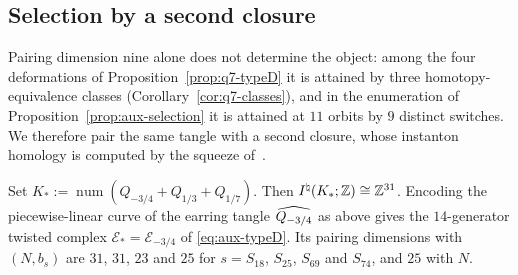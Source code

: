 \subsection{Selection by a second closure}\label{ss:second-closure}
Pairing dimension nine alone does not determine the object: among the four deformations of
Proposition~\ref{prop:q7-typeD} it is attained by three homotopy-equivalence classes
(Corollary~\ref{cor:q7-classes}), and in the enumeration of Proposition~\ref{prop:aux-selection} it is
attained at $11$ orbits by $9$ distinct switches.  We therefore pair the same tangle with a second
closure, whose instanton homology is computed by the squeeze of~\cite[\S3]{WuebbenII}.

\begin{proposition}\label{prop:aux-closure}
Set $K_*:=\operatorname{num}(Q_{-3/4}+Q_{1/3}+Q_{1/7})$.  Then $I^{\natural}(K_*;\mathbb{Z})\cong\mathbb{Z}^{31}$.  Encoding
the piecewise-linear curve of the earring tangle $\widehat{Q_{-3/4}}$ as above gives the $14$-generator twisted
complex $\mathcal E_*=\mathcal E_{-3/4}$ of \eqref{eq:aux-typeD}.  Its pairing dimensions with $(N,b_s)$ are
$31$, $31$, $23$ and $25$ for $s=S_{18}$, $S_{25}$, $S_{69}$ and $S_{74}$, and $25$ with $N$.
\end{proposition}

